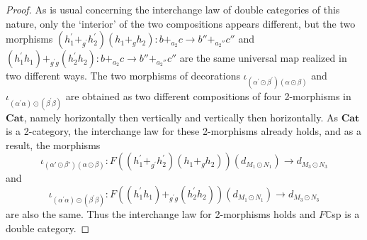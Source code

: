 \documentclass{amsart}
\begin{document}
\begin{proof}
As is usual concerning the interchange law of double categories of this nature, only the `interior' of the two compositions appears different, but the two morphisms $(h_1^\prime +_{g^\prime} h_2^\prime)(h_1 +_g h_2) \colon b+_{a_2} c \to b'' +_{a_2''} c''$ and $(h_1^\prime h_1) +_{g^\prime g} (h_2^\prime h_2) \colon b+_{a_2} c \to b'' +_{a_2''}c''$ are the same universal map realized in two different ways. The two morphisms of decorations $\iota_{(\alpha^\prime \odot \beta^\prime)(\alpha \odot \beta)}$ and $\iota_{(\alpha^\prime \alpha) \odot (\beta^\prime \beta)}$ are obtained as two different compositions of four 2-morphisms in $\mathbf{Cat}$, namely horizontally then vertically and vertically then horizontally. As $\mathbf{Cat}$ is a 2-category, the interchange law for these 2-morphisms already holds, and as a result, the morphisms $$\iota_{(\alpha' \odot \beta')(\alpha \odot \beta)} \colon F((h_1^\prime +_{g^\prime} h_2^\prime)(h_1 +_g h_2))(d_{M_1 \odot N_1}) \to d_{M_3 \odot N_3}$$ and $$\iota_{(\alpha^\prime \alpha)\odot(\beta^\prime \beta)} \colon F((h_1^\prime h_1)+_{g^\prime g} (h_2^\prime h_2))(d_{M_1 \odot N_1}) \to d_{M_3 \odot N_3}$$ are also the same. Thus the interchange law for 2-morphisms holds and $F\mathbb{C}$sp is a double category.
\end{proof}
\end{document}
